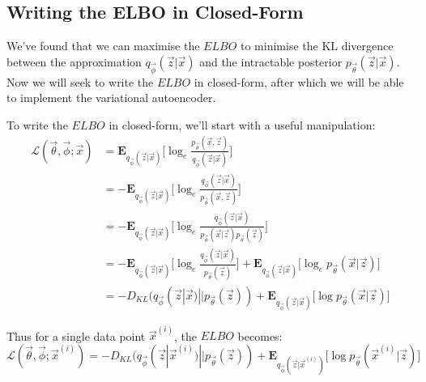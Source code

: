 \subsection{Writing the ELBO in Closed-Form}
We've found that we can maximise the $ELBO$ to minimise the KL divergence between the approximation $q_{\vec{\phi}}(\vec{z}|\vec{x})$ and the intractable posterior $p_{\vec{\theta}}(\vec{z}|\vec{x})$. Now we will seek to write the $ELBO$ in closed-form, after which we will be able to implement the variational autoencoder.

To write the $ELBO$ in closed-form, we'll start with a useful manipulation:
\begin{align}
\mathcal{L}(\vec{\theta}, \vec{\phi}; \vec{x}) &= \mathbf{E}_{q_{\vec{\phi}}(\vec{z}|\vec{x})}\bigg[  \log_e\frac{p_{\vec{\theta}}(\vec{x}, \vec{z})}{q_{\vec{\phi}}(\vec{z}|\vec{x})} \bigg] \\
&= -\mathbf{E}_{q_{\vec{\phi}}(\vec{z}|\vec{x})}\bigg[ \log_e\frac{q_{\vec{\phi}}(\vec{z}|\vec{x})}{p_{\vec{\theta}}(\vec{x}, \vec{z})} \bigg] \\
&= -\mathbf{E}_{q_{\vec{\phi}}(\vec{z}|\vec{x})}\bigg[ \log_e\frac{q_{\vec{\phi}}(\vec{z}|\vec{x})}{p_{\vec{\theta}}(\vec{x} | \vec{z}) p_{\vec{\theta}}(\vec{z})} \bigg] \\
&= -\mathbf{E}_{q_{\vec{\phi}}(\vec{z}|\vec{x})}\bigg[ \log_e\frac{q_{\vec{\phi}}(\vec{z}|\vec{x})}{p_{\vec{\theta}}(\vec{z})} \bigg] +  \mathbf{E}_{q_{\vec{\phi}}(\vec{z}|\vec{x})}\big[\log_e p_{\vec{\theta}}(\vec{x} | \vec{z}) \big]\\
&= -D_{KL}(q_{\vec{\phi}}(\vec{z}|\vec{x}) || p_{\vec{\theta}}(\vec{z})) + \mathbf{E}_{q_{\vec{\phi}}(\vec{z}|\vec{x})}\big[\log p_{\vec{\theta}}(\vec{x} | \vec{z}) \big]
\label{eq:elbo_reconstruction_kl_divergence}
\end{align}

Thus for a single data point $\vec{x}^{(i)}$, the $ELBO$ becomes:
\begin{equation}
\mathcal{L}(\vec{\theta}, \vec{\phi}; \vec{x}^{(i)}) = -D_{KL}(q_{\vec{\phi}}(\vec{z}|\vec{x}^{(i)}) || p_{\vec{\theta}}(\vec{z})) + \mathbf{E}_{q_{\vec{\phi}}(\vec{z}|\vec{x}^{(i)})}\big[\log p_{\vec{\theta}}(\vec{x}^{(i)} | \vec{z}) \big]
\label{eq:elbo_kl_loss_plus_expectation}
\end{equation}


